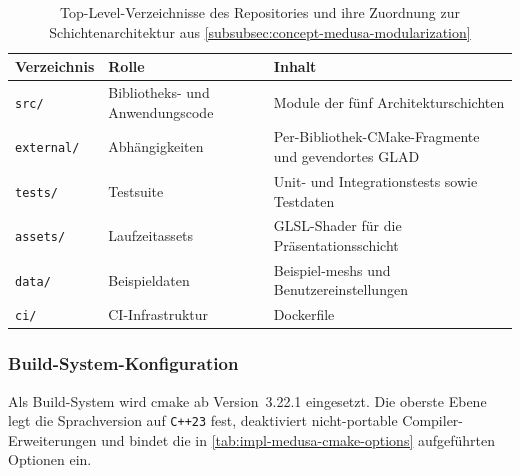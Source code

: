                 \begin{table}[ht]
                    \centering
                    \caption[Top-Level-Verzeichnisse des Repositories]{Top-Level-Verzeichnisse des Repositories und ihre Zuordnung zur Schichtenarchitektur aus \cref{subsubsec:concept-medusa-modularization}}
                    \label{tab:impl-medusa-toplevel-dirs}
                    \renewcommand{\arraystretch}{1.2}
                    \begin{tabular}{@{} l l p{6.5cm} @{}}
                        \toprule
                        \textbf{Verzeichnis} & \textbf{Rolle} & \textbf{Inhalt} \\
                        \midrule
                        \texttt{src/}      & Bibliotheks- und Anwendungscode & Module der fünf Architekturschichten \\
                        \texttt{external/} & Abhängigkeiten                  & Per-Bibliothek-CMake-Fragmente und gevendortes GLAD \\
                        \texttt{tests/}    & Testsuite                       & Unit- und Integrationstests sowie Testdaten \\
                        \texttt{assets/}   & Laufzeitassets                  & GLSL-Shader für die Präsentationsschicht \\
                        \texttt{data/}     & Beispieldaten                   & Beispiel-\glspl{mesh} und Benutzereinstellungen \\
                        \texttt{ci/}       & CI-Infrastruktur                & Dockerfile \\
                        \bottomrule
                    \end{tabular}
                \end{table}

            \subsubsection{Build-System-Konfiguration}\label{subsubsec:impl-medusa-cmake} 
                Als Build-System wird \gls{cmake} ab Version~3.22.1 eingesetzt.
                Die oberste Ebene legt die Sprachversion auf \texttt{C++23} fest, deaktiviert nicht-portable Compiler-Erweiterungen und bindet die in \cref{tab:impl-medusa-cmake-options} aufgeführten Optionen ein.

